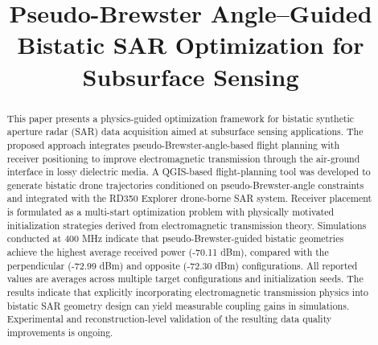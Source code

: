 \documentclass[conference]{IEEEtran}
\begin{document}
\title{Pseudo-Brewster Angle–Guided Bistatic SAR Optimization for Subsurface Sensing}

\author{

\vspace{2pt}
\rule{0.0\linewidth}{0.4pt}
\vspace{4pt}


\vspace{4pt}
}

\maketitle

\begin{abstract}
This paper presents a physics-guided optimization framework for bistatic synthetic aperture radar (SAR) data acquisition aimed at subsurface sensing applications. The proposed approach integrates pseudo-Brewster-angle-based flight planning with receiver positioning to improve electromagnetic transmission through the air-ground interface in lossy dielectric media. A QGIS-based flight-planning tool was developed to generate bistatic drone trajectories conditioned on pseudo-Brewster-angle constraints and integrated with the RD350 Explorer drone-borne SAR system. Receiver placement is formulated as a multi-start optimization problem with physically motivated initialization strategies derived from electromagnetic transmission theory. Simulations conducted at 400 MHz indicate that pseudo-Brewster-guided bistatic geometries achieve the highest average received power (-70.11 dBm), compared with the perpendicular (-72.99 dBm) and opposite (-72.30 dBm) configurations. All reported values are averages across multiple target configurations and initialization seeds. The results indicate that explicitly incorporating electromagnetic transmission physics into bistatic SAR geometry design can yield measurable coupling gains in simulations. Experimental and reconstruction-level validation of the resulting data quality improvements is ongoing.
\end{abstract}
\end{document}
